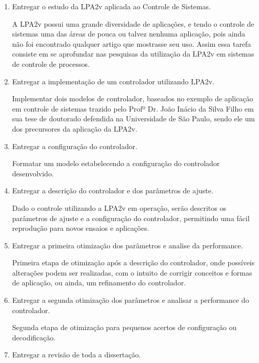 \begin{enumerate}
  \item \label{LPA2v}	    Entregar o estudo da LPA2v aplicada ao Controle de Sistemas.

A LPA2v possui uma grande diversidade de aplicações, 
e tendo o controle de sistemas 
uma das áreas de pouca ou talvez nenhuma aplicação, 
pois ainda não foi encontrado qualquer artigo que mostrasse seu uso. 
Assim essa tarefa consiste em se aprofundar nas pesquisas 
da utilização da LPA2v em sistemas de controle de processos. 

  \item \label{controlar}   Entregar a implementação de um controlador utilizando LPA2v.

Implementar dois modelos de controlador, 
baseados no exemplo de aplicação em controle de sistemas
trazido pelo Profº Dr. João Inácio da Silva Filho em sua 
tese de doutorado defendida na Universidade de São Paulo, 
sendo ele um dos precursores da aplicação da LPA2v. 

  \item \label{configurar}  Entregar a configuração do controlador.

Formatar um modelo estabelecendo a configuração do controlador desenvolvido.

  \item \label{descrever}   Entregar a descrição do controlador e dos parâmetros de ajuste.

Dado o controle utilizando a LPA2v em operação, 
serão descritos os parâmetros de ajuste e a configuração do controlador, 
permitindo uma fácil reprodução para novos ensaios e aplicações.

  \item \label{otimizar1}   Entregar a primeira otimização dos parâmetros e analise da performance.

Primeira etapa de otimização após a descrição do controlador,
onde possíveis alterações podem ser realizadas, 
com o intuito de corrigir conceitos e 
formas de aplicação, ou ainda, 
um refinamento do controlador.

  \item \label{otimizar2}   Entregar a segunda otimização dos parâmetros e analisar a performance do controlador.

Segunda etapa de otimização para pequenos acertos de 
configuração ou decodificação.

  \item \label{entregar}    Entregar a revisão de toda a dissertação.


\end{enumerate}
